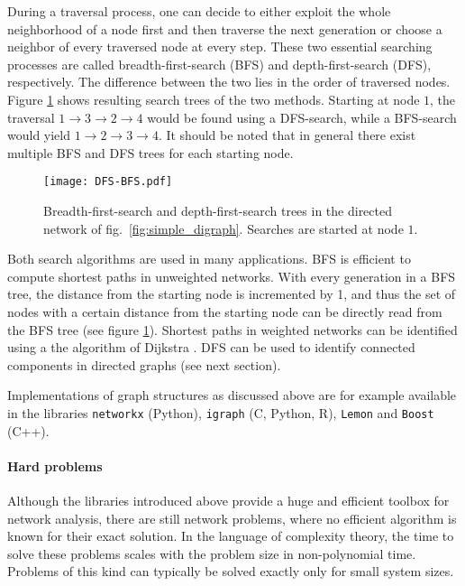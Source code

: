 During a traversal process, one can decide to either exploit the whole neighborhood of a node first and then traverse the next generation or choose a neighbor of every traversed node at every step.
These two essential searching processes are called breadth-first-search (BFS) and depth-first-search (DFS), respectively.
The difference between the two lies in the order of traversed nodes.
Figure \ref{fig:dfs_bfs} shows resulting search trees of the two methods.
Starting at node $1$, the traversal $1\rightarrow 3 \rightarrow 2 \rightarrow 4$ would be found using a DFS-search, while a BFS-search would yield $1\rightarrow 2 \rightarrow 3 \rightarrow 4$.
It should be noted that in general there exist multiple BFS and DFS trees for each starting node. 
%
\begin{figure}[htbp]
\begin{center}
\texttt{[image: DFS-BFS.pdf]}
\caption{Breadth-first-search and depth-first-search trees in the directed network of fig.~\ref{fig:simple_digraph}. Searches are started at node $1$.}
\label{fig:dfs_bfs}
\end{center}
\end{figure}

Both search algorithms are used in many applications.
BFS is efficient to compute shortest paths in unweighted networks.
With every generation in a BFS tree, the distance from the starting node is incremented by 1, and thus the set of nodes with a certain distance from the starting node can be directly read from the BFS tree (see figure \ref{fig:dfs_bfs}).
Shortest paths in weighted networks can be identified using a the algorithm of Dijkstra \citep{Dijkstra:1959}.
DFS can be used to identify connected components in directed graphs (see next section).

Implementations of graph structures as discussed above are for example available in the libraries \verb"networkx" (Python), \verb"igraph" (C, Python, R), \verb"Lemon" and \verb"Boost" (C++).

\paragraph{Hard problems\color{Cayenne}{.}}
Although the libraries introduced above provide a huge and efficient toolbox for network analysis, there are still network problems, where no efficient algorithm is known for their exact solution.
In the language of complexity theory, the time to solve these problems scales with the problem size in non-polynomial time.
Problems of this kind can typically be solved exactly only for small system sizes.

